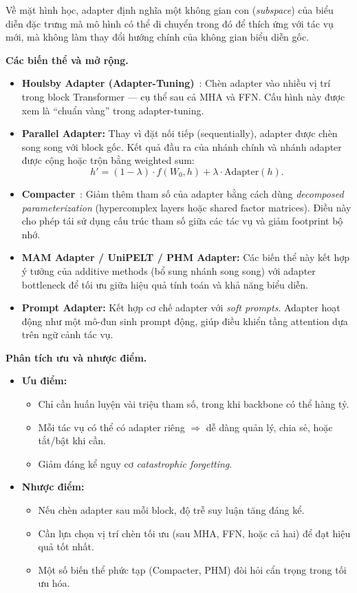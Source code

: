 Về mặt hình học, adapter định nghĩa một không gian con (\textit{subspace}) của biểu diễn đặc trưng mà mô hình có thể di chuyển trong đó để thích ứng với tác vụ mới, mà không làm thay đổi hướng chính của không gian biểu diễn gốc.

\textbf{Các biến thể và mở rộng.}
\begin{itemize}
	\item \textbf{Houlsby Adapter (Adapter-Tuning)}~\cite{houlsby2019parameter}:  
	Chèn adapter vào nhiều vị trí trong block Transformer — cụ thể sau cả MHA và FFN.  
	Cấu hình này được xem là “chuẩn vàng” trong adapter-tuning.
	
	\item \textbf{Parallel Adapter:}  
	Thay vì đặt nối tiếp (sequentially), adapter được chèn song song với block gốc.  
	Kết quả đầu ra của nhánh chính và nhánh adapter được cộng hoặc trộn bằng weighted sum:
	\[
	h' = (1-\lambda) \cdot f(W_0, h) + \lambda \cdot \text{Adapter}(h).
	\]
	
	\item \textbf{Compacter}~\cite{mahabadi2021compacter}:  
	Giảm thêm tham số của adapter bằng cách dùng \textit{decomposed parameterization} (hypercomplex layers hoặc shared factor matrices).  
	Điều này cho phép tái sử dụng cấu trúc tham số giữa các tác vụ và giảm footprint bộ nhớ.
	
	\item \textbf{MAM Adapter\cite{he2022towards} / UniPELT\cite{ma2022unipelt} / PHM Adapter\cite{zhang2021phm}:}  
	Các biến thể này kết hợp ý tưởng của additive methods (bổ sung nhánh song song) với adapter bottleneck để tối ưu giữa hiệu quả tính toán và khả năng biểu diễn.
	
	\item \textbf{Prompt Adapter:}  
	Kết hợp cơ chế adapter với \textit{soft prompts}. Adapter hoạt động như một mô-đun sinh prompt động, giúp điều khiển tầng attention dựa trên ngữ cảnh tác vụ.
\end{itemize}

\textbf{Phân tích ưu và nhược điểm.}
\begin{itemize}
	\item \textbf{Ưu điểm:}
	\begin{itemize}
		\item Chỉ cần huấn luyện vài triệu tham số, trong khi backbone có thể hàng tỷ.  
		\item Mỗi tác vụ có thể có adapter riêng $\Rightarrow$ dễ dàng quản lý, chia sẻ, hoặc tắt/bật khi cần.  
		\item Giảm đáng kể nguy cơ \textit{catastrophic forgetting}.  
	\end{itemize}
	\item \textbf{Nhược điểm:}
	\begin{itemize}
		\item Nếu chèn adapter sau mỗi block, độ trễ suy luận tăng đáng kể.  
		\item Cần lựa chọn vị trí chèn tối ưu (sau MHA, FFN, hoặc cả hai) để đạt hiệu quả tốt nhất.  
		\item Một số biến thể phức tạp (Compacter, PHM) đòi hỏi cẩn trọng trong tối ưu hóa.  
	\end{itemize}
\end{itemize}

